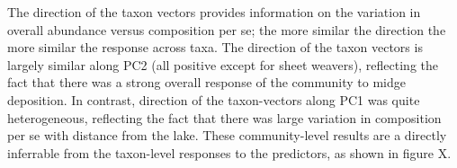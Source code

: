 The direction of the taxon vectors provides information on the variation in overall abundance versus composition per se; the more
similar the direction the more similar the response across taxa. The direction of the taxon vectors is largely similar along PC2 (all
positive except for sheet weavers), reflecting the fact that there was a strong overall response of the community to midge
deposition. In contrast, direction of the taxon-vectors along PC1 was quite heterogeneous, reflecting the fact that there was large
variation in composition per se with distance from the lake. These community-level results are a directly inferrable from the
taxon-level responses to the predictors, as shown in figure X.
